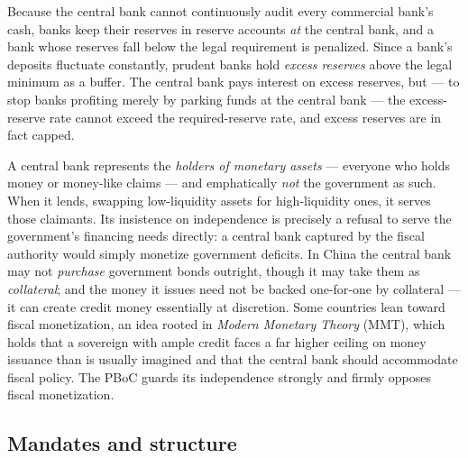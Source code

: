 Because the central bank cannot continuously audit every commercial bank's cash, banks keep their reserves in reserve accounts \emph{at} the central bank, and a bank whose reserves fall below the legal requirement is penalized. Since a bank's deposits fluctuate constantly, prudent banks hold \emph{excess reserves} above the legal minimum as a buffer. The central bank pays interest on excess reserves, but --- to stop banks profiting merely by parking funds at the central bank --- the excess-reserve rate cannot exceed the required-reserve rate, and excess reserves are in fact capped.


\begin{remark}
A central bank represents the \emph{holders of monetary assets} --- everyone who holds money or money-like claims --- and emphatically \emph{not} the government as such. When it lends, swapping low-liquidity assets for high-liquidity ones, it serves those claimants. Its insistence on independence is precisely a refusal to serve the government's financing needs directly: a central bank captured by the fiscal authority would simply monetize government deficits. In China the central bank may not \emph{purchase} government bonds outright, though it may take them as \emph{collateral}; and the money it issues need not be backed one-for-one by collateral --- it can create credit money essentially at discretion. Some countries lean toward fiscal monetization, an idea rooted in \emph{Modern Monetary Theory} (MMT), which holds that a sovereign with ample credit faces a far higher ceiling on money issuance than is usually imagined and that the central bank should accommodate fiscal policy. The PBoC guards its independence strongly and firmly opposes fiscal monetization.
\end{remark}

\subsection{Mandates and structure}

